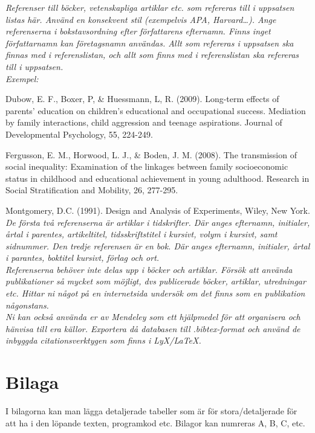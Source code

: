 \documentclass[10pt,swedish]{book}
\begin{document}
\textit{Referenser till böcker, vetenskapliga artiklar etc. som refereras
till i uppsatsen listas här. Använd en konsekvent stil (exempelvis
APA, Harvard\dots ). Ange referenserna i bokstavsordning efter författarens
efternamn. Finns inget författarnamn kan företagsnamn användas. Allt
som refereras i uppsatsen ska finnas med i referenslistan, och allt
som finns med i referenslistan ska refereras till i uppsatsen. 
\\[\baselineskip]
Exempel:
}

Dubow, E. F., Boxer, P, \& Huessmann, L, R. (2009). Long-term effects
of parents' education on children's educational and occupational success.
Mediation by family interactions, child aggression and teenage aspirations.
Journal of Developmental Psychology, 55, 224-249. 

Fergusson, E. M., Horwood, L. J., \& Boden, J. M. (2008). The transmission
of social inequality: Examination of the linkages between family socioeconomic
status in childhood and educational achievement in young adulthood.
Research in Social Stratification and Mobility, 26, 277-295. 

Montgomery, D.C. (1991). Design and Analysis of Experiments, Wiley,
New York. 
\\[\baselineskip]

\textit{De första två referenserna är artiklar i tidskrifter. Där anges efternamn,
initialer, årtal i parentes, artikeltitel, tidsskriftstitel i kursivt,
volym i kursivt, samt sidnummer. Den tredje referensen är en bok.
Där anges efternamn, initialer, årtal i parantes, boktitel kursivt,
förlag och ort. 
\\[\baselineskip]
Referenserna behöver inte delas upp i böcker och artiklar. Försök
att använda publikationer så mycket som möjligt, dvs publicerade böcker,
artiklar, utredningar etc. Hittar ni något på en internetsida \textendash{}
undersök om det finns som en publikation någonstans.
\\[\baselineskip]
Ni kan också använda er av Mendeley som ett hjälpmedel för att organisera
och hänvisa till era källor. Exportera då databasen till .bibtex-format
och använd de inbyggda citationsverktygen som finns i LyX/LaTeX.}

\appendix
\backmatter
{}

\chapter*{Bilaga}

I bilagorna kan man lägga detaljerade tabeller som är för stora/detaljerade
för att ha i den löpande texten, programkod etc. Bilagor kan numreras
A, B, C, etc.
\end{document}
